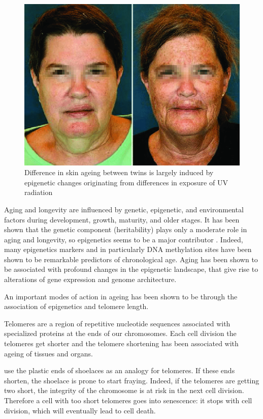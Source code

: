 \documentclass[
  11pt,
]{book}
\begin{document}
\begin{figure}

{\centering \includegraphics[width=0.5\linewidth]{./figs/dentical-twins-with-phenotypic-discordance-due-to-environmental-exposure-Although-MZ} 

}

\caption{Difference in skin ageing between twins is largely induced by epigenetic changes originating from differences in exposure of UV radiation \citep{Schwab2017}}\label{fig:epiUV}
\end{figure}

Aging and longevity are influenced by genetic, epigenetic, and environmental factors during development, growth, maturity, and older stages.
It has been shown that the genetic component (heritability) plays only a moderate role in aging and longevity, so epigenetics seems to be a major contributor \citep{Adwan2018}. Indeed, many epigenetics markers and in particularly DNA methylation sites have been shown to be remarkable predictors of chronological age.
Aging has been shown to be associated
with profound changes in the epigenetic landscape, that give rise to alterations of gene expression and genome architecture.

An important modes of action in ageing has been shown to be through the association of epigenetics and telomere length.

Telomeres are a region of repetitive nucleotide sequences associated with specialized proteins at the ends of our chromosomes. Each cell division the telomeres get shorter and the telomere shortening has been associated with ageing of tissues and organs.

\citet{BlackburnEpel2017} use the plastic ends of shoelaces as an analogy for telomeres. If these ends shorten, the shoelace is prone to start fraying. Indeed, if the telomeres are getting two short, the integrity of the chromosome is at risk in the next cell division. Therefore a cell with too short telomeres goes into senescence: it stops with cell division, which will eventually lead to cell death.
\end{document}
